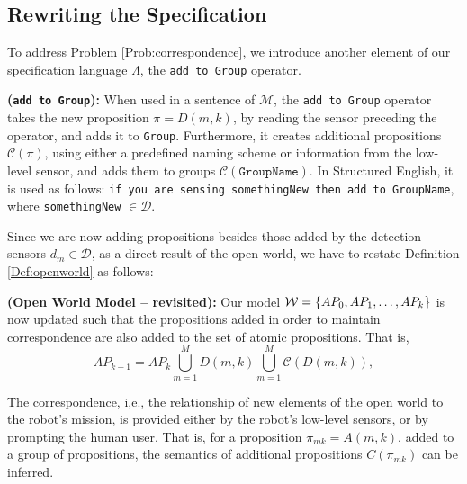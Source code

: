 \subsection{Rewriting the Specification} %

To address Problem \ref{Prob:correspondence}, we introduce another element of our specification language $\Lambda$, the \texttt{add to Group} operator.

\begin{myDefinition}\label{Def:addto}
	\textbf{(\texttt{add to Group}):} When used in a sentence of $\mathcal{M}$, the \texttt{add to Group} operator takes the new proposition $\pi = D(m,k)$, by reading the sensor preceding the operator, and adds it to \texttt{Group}. Furthermore, it creates additional propositions $\mathcal{C}(\pi)$, using either a predefined naming scheme or information from the low-level sensor, and adds them to groups $\mathcal{C}(\texttt{GroupName})$. In Structured English, it is used as follows: \texttt{if you are sensing somethingNew then add to GroupName}, where \texttt{somethingNew} $\in \mathcal{D}$.
\end{myDefinition}

Since we are now adding propositions besides those added by the detection sensors $d_m \in \mathcal{D}$, as a direct result of the open world, we have to restate Definition \ref{Def:openworld} as follows:

\begin{myDefinition}\label{Def:openworld2}	
	\textbf{(Open World Model -- revisited):} Our model $\mathcal{W} = \left\{ AP_0, AP_1, \ldots, AP_k \right\}$ is now updated such that the propositions added in order to maintain correspondence are also added to the set of atomic propositions. That is, 
	\begin{equation}\label{Eq:updateAP2}
		AP_{k+1} = AP_k \bigcup_{m=1}^{M}D(m, k) \bigcup_{m=1}^{M}\mathcal{C}(D(m, k)),
	\end{equation}
\end{myDefinition}

\begin{myAssumption}
	The correspondence, i,e., the relationship of new elements of the open world to the robot's mission, is provided either by the robot's low-level sensors, or by prompting the human user. That is, for a proposition $\pi_{mk} = A(m, k)$, added to a group of propositions, the semantics of additional propositions $C(\pi_{mk})$ can be inferred.
\end{myAssumption}

